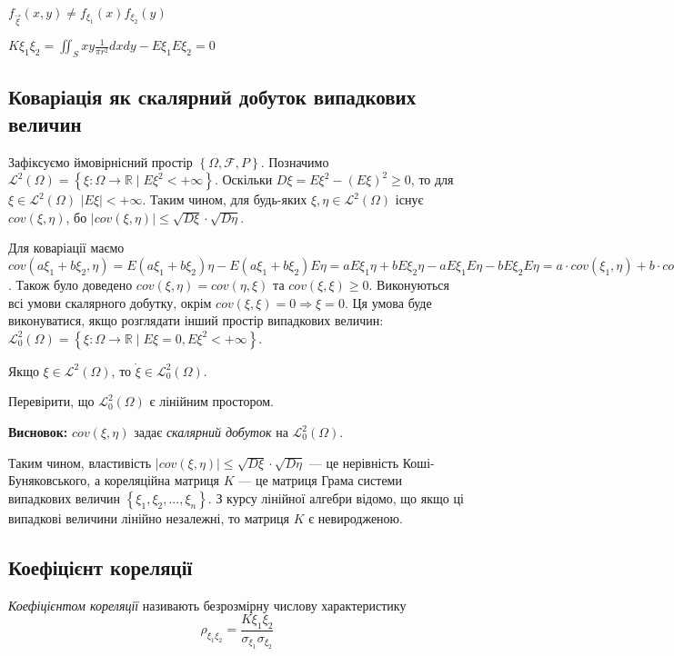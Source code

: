 $f_{\vec{\xi}}(x,y) \neq f_{\xi_1}(x)f_{\xi_2}(y)$

$K\xi_1\xi_2 = \iint_S xy \frac{1}{\pi r^2} dxdy - E\xi_1E\xi_2 = 0$

\subsection{Коваріація як скалярний добуток випадкових величин}
Зафіксуємо ймовірнісний простір $\left\{\Omega, \mathcal{F}, P\right\}$.
Позначимо $\mathcal{L}^2(\Omega) = \left\{\xi : \Omega \rightarrow \mathbb{R} \;|\; E\xi^2 < +\infty\right\}$.
Оскільки $D\xi = E\xi^2 - (E\xi)^2 \geq 0$, то для $\xi \in \mathcal{L}^2(\Omega)$ $|E\xi| < +\infty$.
Таким чином, для будь-яких $\xi, \eta \in \mathcal{L}^2(\Omega)$ 
існує ${cov}(\xi,\eta)$, бо $|{cov}(\xi,\eta)| \leq \sqrt{D\xi} \cdot \sqrt{D\eta}$.

Для коваріації маємо 
${cov}(a\xi_1 + b\xi_2,\eta) = E(a\xi_1+b\xi_2)\eta - E(a\xi_1 + b\xi_2)E\eta = 
a E\xi_1\eta + b E\xi_2\eta - a E\xi_1 E\eta - b E\xi_2 E\eta = a\cdot{cov}(\xi_1,\eta) + b\cdot{cov}(\xi_2,\eta)$.
Також було доведено ${cov}(\xi, \eta) = {cov}(\eta, \xi)$ та ${cov}(\xi, \xi) \geq 0$.
Виконуються всі умови скалярного добутку, окрім ${cov}(\xi, \xi) = 0 \Rightarrow \xi = 0$.
Ця умова буде виконуватися, якщо розглядати інший простір випадкових величин:
$\mathcal{L}_0^2(\Omega) = \left\{\xi : \Omega \rightarrow \mathbb{R} \;|\; E\xi = 0, E\xi^2 < +\infty\right\}$.
\begin{remark}
    Якщо $\xi \in \mathcal{L}^2(\Omega)$, то $\mathring{\xi} \in \mathcal{L}_0^2(\Omega)$.
\end{remark}
\begin{exercise}
    Перевірити, що $\mathcal{L}_0^2(\Omega)$ є лінійним простором.
\end{exercise}

\noindent \textbf{Висновок:} ${cov}(\xi, \eta)$ задає \emph{скалярний добуток} на $\mathcal{L}_0^2(\Omega)$.

Таким чином, властивість $|{cov}(\xi,\eta)| \leq \sqrt{D\xi} \cdot \sqrt{D\eta}$ ---
це нерівність Коші-Буняковського, а кореляційна матриця $K$ --- це матриця Грама системи
випадкових величин $\left\{\xi_1, \xi_2, ..., \xi_n\right\}$.
З курсу лінійної алгебри відомо, що якщо ці випадкові величини лінійно незалежні, то матриця $K$ є невиродженою.

\subsection{Коефіцієнт кореляції}
\begin{definition}
    \emph{Коефіцієнтом кореляції} називають безрозмірну числову характеристику
    \begin{equation*}
        \rho_{\xi_1\xi_2} = \frac{K\xi_1\xi_2}{\sigma_{\xi_1}\sigma_{\xi_2}}
    \end{equation*}
\end{definition}

